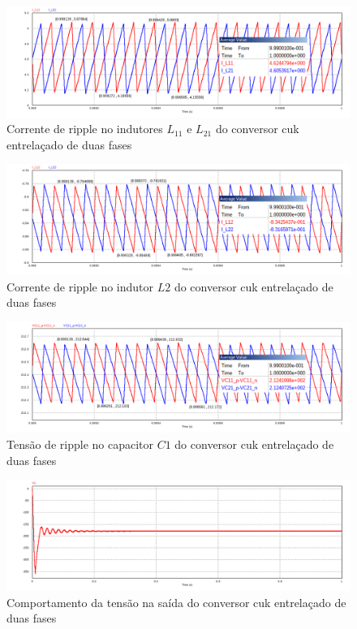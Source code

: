\documentclass[
	12pt,				%
	openright,			%
	onseside,
	a4paper,			%
	english,			%
	french,				%
	spanish,			%
	brazil,				%
	]{abntex2}
\begin{document}
\begin{figure}[htbp]%
	\centering
		\includegraphics[width=0.8 \linewidth]{cuk_inter_ripp_I_LX1}
		\caption{Corrente de ripple no indutores $L_{11}$ e $L_{21}$ do conversor cuk entrelaçado de duas fases}
		\label{fig:cuk_inter_ripp_I_L1}
\end{figure}

\begin{figure}[htbp]%
	\centering
		\includegraphics[width=0.8 \linewidth]{cuk_inter_ripp_I_LX2}
		\caption{Corrente de ripple no indutor $L2$ do conversor cuk entrelaçado de duas fases}
		\label{fig:cuk_inter_ripp_I_L2}
\end{figure}

\begin{figure}[htbp]%
	\centering
		\includegraphics[width=0.8 \linewidth]{cuk_inter_ripp_V_CX1}
		\caption{Tensão de ripple no capacitor $C1$ do conversor cuk entrelaçado de duas fases}
		\label{fig:cuk_inter_ripp_V_C1}
\end{figure}

\begin{figure}[htbp]%
	\centering
		\includegraphics[width=0.8 \linewidth]{cuk_inter_V_out}
		\caption{Comportamento da tensão na saída do conversor cuk entrelaçado de duas fases}
		\label{fig:cuk_inter_ripp_V_out}
\end{figure}
\end{document}
